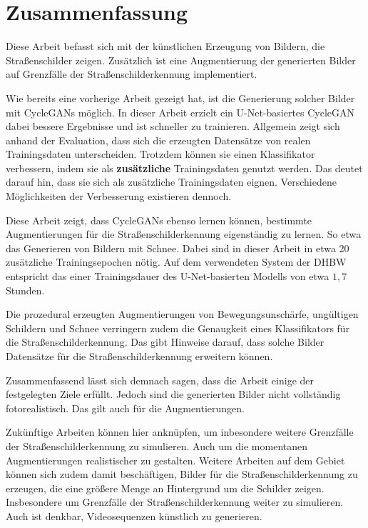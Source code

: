 \chapter{Zusammenfassung}

Diese Arbeit befasst sich mit der künstlichen Erzeugung von Bildern, die Straßenschilder zeigen. Zusätzlich ist eine Augmentierung der generierten Bilder auf Grenzfälle der Straßenschilderkennung implementiert.

Wie bereits eine vorherige Arbeit gezeigt hat, ist die Generierung solcher Bilder mit \acp{CycleGAN} möglich. In dieser Arbeit erzielt ein U-Net-basiertes \ac{CycleGAN} dabei bessere Ergebnisse und ist schneller zu trainieren. Allgemein zeigt sich anhand der Evaluation, dass sich die erzeugten Datensätze von realen Trainingsdaten unterscheiden. Trotzdem können sie einen Klassifikator verbessern, indem sie als \textbf{zusätzliche} Trainingsdaten genutzt werden. Das deutet darauf hin, dass sie sich als zusätzliche Trainingsdaten eignen. Verschiedene Möglichkeiten der Verbesserung existieren dennoch.

Diese Arbeit zeigt, dass \acp{CycleGAN} ebenso lernen können, bestimmte Augmentierungen für die Straßenschilderkennung eigenständig zu lernen. So etwa das Generieren von Bildern mit Schnee. Dabei sind in dieser Arbeit in etwa 20 zusätzliche Trainingsepochen nötig. Auf dem verwendeten System der \ac{DHBW} entspricht das einer Trainingsdauer des U-Net-basierten Modells von etwa $1,7$ Stunden.

Die prozedural erzeugten Augmentierungen von Bewegungsunschärfe, ungültigen Schildern und Schnee verringern zudem die Genaugkeit eines Klassifikators für die Straßenschilderkennung. Das gibt Hinweise darauf, dass solche Bilder Datensätze für die Straßenschilderkennung erweitern können.

Zusammenfassend lässt sich demnach sagen, dass die Arbeit einige der festgelegten Ziele erfüllt. Jedoch sind die generierten Bilder nicht vollständig fotorealistisch. Das gilt auch für die Augmentierungen.

Zukünftige Arbeiten können hier anknüpfen, um inbesondere weitere Grenzfälle der Straßenschilderkennung zu simulieren. Auch um die momentanen Augmentierungen realistischer zu gestalten. Weitere Arbeiten auf dem Gebiet können sich zudem damit beschäftigen, Bilder für die Straßenschilderkennung zu erzeugen, die eine größere Menge an Hintergrund um die Schilder zeigen. Insbesondere um Grenzfälle der Straßenschilderkennung weiter zu simulieren. Auch ist denkbar, Videosequenzen künstlich zu generieren.